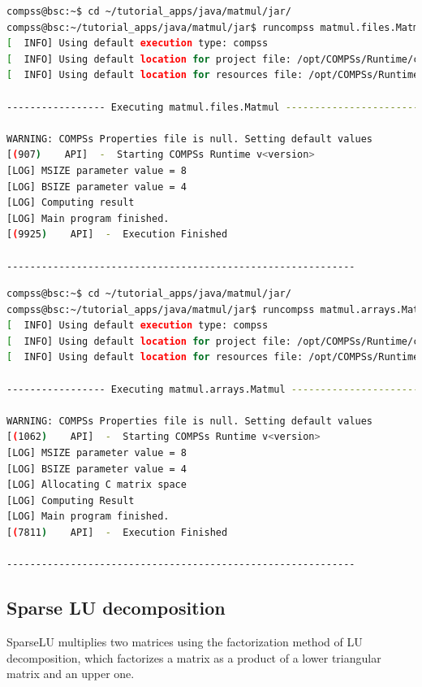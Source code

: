 \begin{lstlisting}[language=bash]
compss@bsc:~$ cd ~/tutorial_apps/java/matmul/jar/
compss@bsc:~/tutorial_apps/java/matmul/jar$ runcompss matmul.files.Matmul 8 4
[  INFO] Using default execution type: compss
[  INFO] Using default location for project file: /opt/COMPSs/Runtime/configuration/xml/projects/default_project.xml
[  INFO] Using default location for resources file: /opt/COMPSs/Runtime/configuration/xml/resources/default_resources.xml

----------------- Executing matmul.files.Matmul --------------------------

WARNING: COMPSs Properties file is null. Setting default values
[(907)    API]  -  Starting COMPSs Runtime v<version>
[LOG] MSIZE parameter value = 8
[LOG] BSIZE parameter value = 4
[LOG] Computing result
[LOG] Main program finished.
[(9925)    API]  -  Execution Finished

------------------------------------------------------------
\end{lstlisting}


\begin{lstlisting}[language=bash]
compss@bsc:~$ cd ~/tutorial_apps/java/matmul/jar/
compss@bsc:~/tutorial_apps/java/matmul/jar$ runcompss matmul.arrays.Matmul 8 4
[  INFO] Using default execution type: compss
[  INFO] Using default location for project file: /opt/COMPSs/Runtime/configuration/xml/projects/default_project.xml
[  INFO] Using default location for resources file: /opt/COMPSs/Runtime/configuration/xml/resources/default_resources.xml

----------------- Executing matmul.arrays.Matmul --------------------------

WARNING: COMPSs Properties file is null. Setting default values
[(1062)    API]  -  Starting COMPSs Runtime v<version>
[LOG] MSIZE parameter value = 8
[LOG] BSIZE parameter value = 4
[LOG] Allocating C matrix space
[LOG] Computing Result
[LOG] Main program finished.
[(7811)    API]  -  Execution Finished

------------------------------------------------------------
\end{lstlisting}


\subsection{Sparse LU decomposition}
SparseLU multiplies two matrices using the factorization method of LU decomposition, which factorizes a 
matrix as a product of a lower triangular matrix and an upper one.

